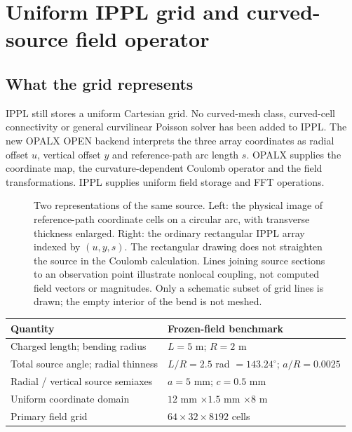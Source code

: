 \section{Uniform IPPL grid and curved-source field operator}
\label{sec:mapped-grid}

\subsection{What the grid represents}
IPPL still stores a uniform Cartesian grid. No curved-mesh class, curved-cell
connectivity or general curvilinear Poisson solver has been added to IPPL.
The new OPALX OPEN backend interprets the three array coordinates as radial
offset $u$, vertical offset $y$ and reference-path arc length $s$. OPALX supplies
the coordinate map, the curvature-dependent Coulomb operator and the field
transformations. IPPL supplies uniform field storage and FFT operations.

\begin{figure}[H]
 \centering
 
 \caption{Two representations of the same source. Left: the physical image of
 reference-path coordinate cells on a circular arc, with transverse thickness
 enlarged. Right: the ordinary rectangular IPPL array indexed by $(u,y,s)$.
 The rectangular drawing does not straighten the source in the Coulomb
 calculation. Lines joining source sections to an observation point illustrate
 nonlocal coupling, not computed field vectors or magnitudes. Only a schematic
 subset of grid lines is drawn; the empty interior of the bend is not meshed.}
 \label{fig:mg-geometry}
\end{figure}

\begin{center}\small
\begin{tabular}{ll}\toprule
Quantity & Frozen-field benchmark\\\midrule
Charged length; bending radius & $L=5$ m; $R=2$ m\\
Total source angle; radial thinness & $L/R=2.5$ rad $=143.24^\circ$; $a/R=0.0025$\\
Radial / vertical source semiaxes & $a=5$ mm; $c=0.5$ mm\\
Uniform coordinate domain & $12$ mm $\times1.5$ mm $\times8$ m\\
Primary field grid & $64\times32\times8192$ cells\\\bottomrule
\end{tabular}
\end{center}

